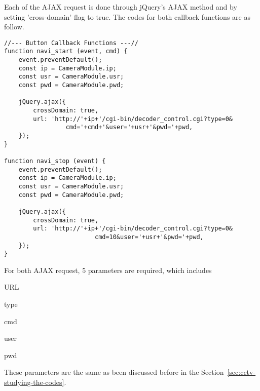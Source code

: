 Each of the AJAX request is done through jQuery's AJAX method and by setting 'cross-domain' flag to true. The codes for both callback functions are as follow.

\begin{lstlisting}
//--- Button Callback Functions ---//
function navi_start (event, cmd) {
	event.preventDefault();
	const ip = CameraModule.ip;
	const usr = CameraModule.usr;
	const pwd = CameraModule.pwd;
	
	jQuery.ajax({
		crossDomain: true,
		url: 'http://'+ip+'/cgi-bin/decoder_control.cgi?type=0&
		         cmd='+cmd+'&user='+usr+'&pwd='+pwd,
	});
}

function navi_stop (event) {
	event.preventDefault();
	const ip = CameraModule.ip;
	const usr = CameraModule.usr;
	const pwd = CameraModule.pwd;
	
	jQuery.ajax({
		crossDomain: true,
		url: 'http://'+ip+'/cgi-bin/decoder_control.cgi?type=0&
                         cmd=10&user='+usr+'&pwd='+pwd,
	});
}
\end{lstlisting}

For both AJAX request, 5 parameters are required, which includes
\begin{itemize*}
\item URL
\item type
\item cmd
\item user
\item pwd
\end{itemize*}
These parameters are the same as been discussed before in the Section~\ref{sec:cctv-studying-the-codes}.
